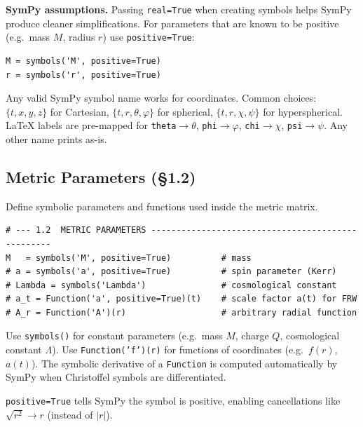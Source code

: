 \documentclass[11pt,a4paper]{article}
\newcommand{\code}[1]{\texttt{\small#1}}
\begin{document}
\textbf{SymPy assumptions.}  Passing \code{real=True} when creating symbols
helps SymPy produce cleaner simplifications.  For parameters that are known
to be positive (e.g.\ mass $M$, radius $r$) use \code{positive=True}:

\begin{lstlisting}
M = symbols('M', positive=True)
r = symbols('r', positive=True)
\end{lstlisting}

\begin{notebox}
  Any valid SymPy symbol name works for coordinates.  Common choices:
  $\{t,x,y,z\}$ for Cartesian, $\{t,r,\theta,\varphi\}$ for spherical,
  $\{t,r,\chi,\psi\}$ for hyperspherical.
  LaTeX labels are pre-mapped for \code{theta}$\to\theta$,
  \code{phi}$\to\varphi$, \code{chi}$\to\chi$, \code{psi}$\to\psi$.
  Any other name prints as-is.
\end{notebox}

\subsection{Metric Parameters (\S1.2)}
\label{sec:cfg-params}

Define symbolic parameters and functions used inside the metric matrix.

\begin{lstlisting}
# --- 1.2  METRIC PARAMETERS --------------------------------------------------
M   = symbols('M', positive=True)          # mass
# a = symbols('a', positive=True)          # spin parameter (Kerr)
# Lambda = symbols('Lambda')               # cosmological constant
# a_t = Function('a', positive=True)(t)    # scale factor a(t) for FRW
# A_r = Function('A')(r)                   # arbitrary radial function
\end{lstlisting}

\begin{description}[leftmargin=2cm,style=nextline]
  \item[\code{Symbol} vs.\ \code{Function}]
    Use \code{symbols()} for constant parameters (e.g.\ mass $M$, charge
    $Q$, cosmological constant $\Lambda$). \newline
    Use \code{Function('f')(r)} for functions of coordinates (e.g.\
    $f(r)$, $a(t)$).  The symbolic derivative of a \code{Function} is
    computed automatically by SymPy when Christoffel symbols are
    differentiated.

  \item[Assumptions]
    \code{positive=True} tells SymPy the symbol is positive, enabling
    cancellations like $\sqrt{r^2} \to r$ (instead of $|r|$).
\end{description}
\end{document}
